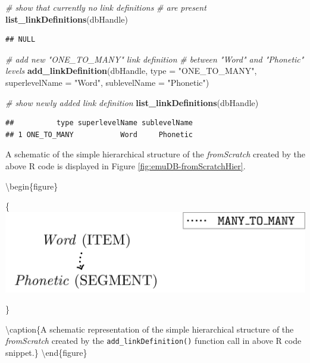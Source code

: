 \documentclass[]{book}
\newenvironment{Shaded}{\begin{snugshade}}{\end{snugshade}}
\newcommand{\CommentTok}[1]{\textcolor[rgb]{0.56,0.35,0.01}{\textit{#1}}}
\newcommand{\DataTypeTok}[1]{\textcolor[rgb]{0.13,0.29,0.53}{#1}}
\newcommand{\KeywordTok}[1]{\textcolor[rgb]{0.13,0.29,0.53}{\textbf{#1}}}
\newcommand{\NormalTok}[1]{#1}
\newcommand{\StringTok}[1]{\textcolor[rgb]{0.31,0.60,0.02}{#1}}
\begin{document}
\begin{Shaded}
\begin{Highlighting}[]
\CommentTok{# show that currently no link definitions}
\CommentTok{# are present}
\KeywordTok{list_linkDefinitions}\NormalTok{(dbHandle)}
\end{Highlighting}
\end{Shaded}

\begin{verbatim}
## NULL
\end{verbatim}

\begin{Shaded}
\begin{Highlighting}[]
\CommentTok{# add new "ONE_TO_MANY" link definition}
\CommentTok{# between "Word" and "Phonetic" levels}
\KeywordTok{add_linkDefinition}\NormalTok{(dbHandle,}
                   \DataTypeTok{type =} \StringTok{"ONE_TO_MANY"}\NormalTok{,}
                   \DataTypeTok{superlevelName =} \StringTok{"Word"}\NormalTok{,}
                   \DataTypeTok{sublevelName =} \StringTok{"Phonetic"}\NormalTok{)}

\CommentTok{# show newly added link definition}
\KeywordTok{list_linkDefinitions}\NormalTok{(dbHandle)}
\end{Highlighting}
\end{Shaded}

\begin{verbatim}
##          type superlevelName sublevelName
## 1 ONE_TO_MANY           Word     Phonetic
\end{verbatim}

A schematic of the simple hierarchical structure of the \emph{fromScratch} created by the above R code is displayed in Figure \ref{fig:emuDB-fromScratchHier}.

\textbackslash{}begin\{figure\}

\{\centering \includegraphics[width=0.5\linewidth]{pics/fromScratchDBgraph}

\}

\textbackslash{}caption\{A schematic representation of the simple hierarchical structure of the \emph{fromScratch} created by the \texttt{add\_linkDefinition()} function call in above R code snippet.\}\label{fig:emuDB-fromScratchHier}
\textbackslash{}end\{figure\}
\end{document}
